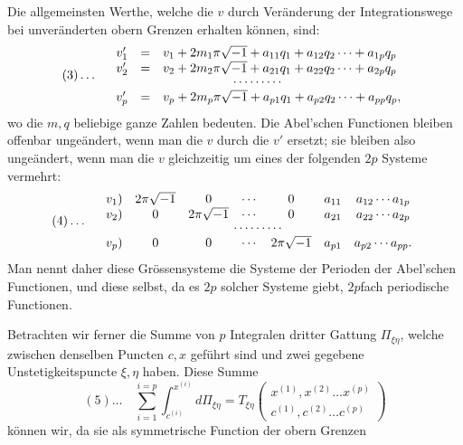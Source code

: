 \documentclass[10pt]{article}
\begin{document}
Die allgemeinsten Werthe, welche die \(v\) durch Veränderung der Integrationswege bei unveränderten obern Grenzen erhalten können, sind:
\[
(3)\ldots\quad
\begin{array}{rcl}
v_1'&=&v_1+2m_1\pi\sqrt{-1}+a_{11}q_1+a_{12}q_2\cdots+a_{1p}q_p\\
v_2'&=&v_2+2m_2\pi\sqrt{-1}+a_{21}q_1+a_{22}q_2\cdots+a_{2p}q_p\\[-0.15em]
\multicolumn{3}{c}{\cdots\cdots\cdots}\\
v_p'&=&v_p+2m_p\pi\sqrt{-1}+a_{p1}q_1+a_{p2}q_2\cdots+a_{pp}q_p,
\end{array}
\]
wo die \(m,q\) beliebige ganze Zahlen bedeuten. Die Abel'schen Functionen bleiben offenbar ungeändert, wenn man die \(v\) durch die \(v'\) ersetzt; sie bleiben also ungeändert, wenn man die \(v\) gleichzeitig um eines der folgenden \(2p\) Systeme vermehrt:
\[
(4)\ldots\quad
\begin{array}{rcccccc}
v_1)&2\pi\sqrt{-1}&0&\cdots&0&a_{11}&a_{12}\cdots a_{1p}\\
v_2)&0&2\pi\sqrt{-1}&\cdots&0&a_{21}&a_{22}\cdots a_{2p}\\[-0.15em]
\multicolumn{7}{c}{\cdots\cdots\cdots}\\
v_p)&0&0&\cdots&2\pi\sqrt{-1}&a_{p1}&a_{p2}\cdots a_{pp}.
\end{array}
\]
Man nennt daher diese Grössensysteme die Systeme der Perioden der Abel'schen Functionen, und diese selbst, da es \(2p\) solcher Systeme giebt, \(2p\)fach periodische Functionen.

Betrachten wir ferner die Summe von \(p\) Integralen dritter Gattung \(\Pi_{\xi\eta}\), welche zwischen denselben Puncten \(c,x\) geführt sind und zwei gegebene Unstetigkeitspuncte \(\xi,\eta\) haben. Diese Summe
\[
(5)\ldots\quad
\sum_{i=1}^{i=p}\int_{c^{(i)}}^{x^{(i)}}d\Pi_{\xi\eta}
=T_{\xi\eta}\begin{pmatrix}x^{(1)},x^{(2)}\ldots x^{(p)}\\ c^{(1)},c^{(2)}\ldots c^{(p)}\end{pmatrix}
\]
können wir, da sie als symmetrische Function der obern Grenzen



\small

\end{document}
